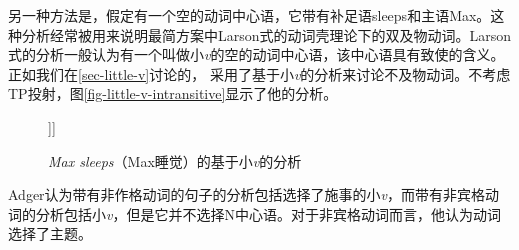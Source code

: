 另一种方法是，假定有一个空的动词中心语，它带有补足语sleeps和主语Max。这种分析经常被用来说明最简方案中Larson式的动词壳\citep{Larson88a}理论下的双及物动词。Larson式的分析一般认为有一个叫做小\emph{v}的空的动词中心语，该中心语具有致使的含义。正如我们在\ref{sec-little-v}讨论的， \citet{Adger2003a}采用了基于小\emph{v}的分析来讨论不及物动词。不考虑TP投射，图\vref{fig-little-v-intransitive}显示了他的分析。
\begin{figure}
\begin{forest}
[\emph{v}P
  [Max]
  [{$\overline{v}$}
    [\textit{v}]
    [\emph{sleep}]]]
\end{forest}
\caption{\label{fig-little-v-intransitive}\emph{Max sleeps}（Max睡觉）的基于小\emph{v}的分析}
\end{figure}%
Adger认为带有非作格动词的句子的分析包括选择了施事的小\emph{v}，而带有非宾格动词的分析包括小\emph{v}，但是它并不选择N中心语。对于非宾格动词而言，他认为动词选择了主题。
